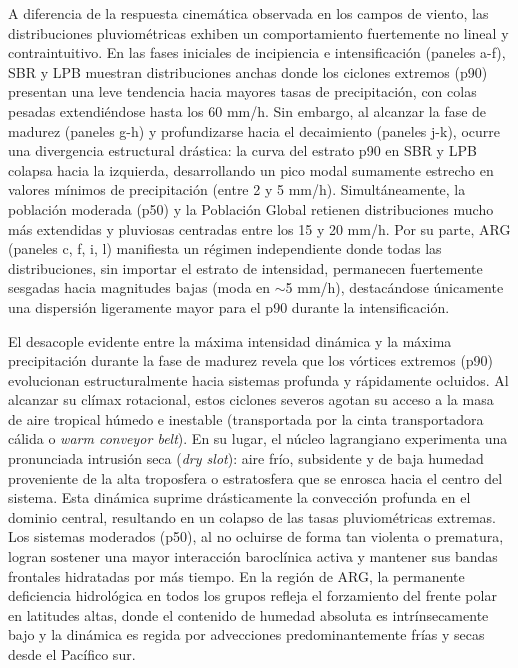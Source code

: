 A diferencia de la respuesta cinemática observada en los campos de viento, las distribuciones pluviométricas exhiben un comportamiento fuertemente no lineal y contraintuitivo. En las fases iniciales de incipiencia e intensificación (paneles a-f), SBR y LPB muestran distribuciones anchas donde los ciclones extremos (p90) presentan una leve tendencia hacia mayores tasas de precipitación, con colas pesadas extendiéndose hasta los 60 mm/h. Sin embargo, al alcanzar la fase de madurez (paneles g-h) y profundizarse hacia el decaimiento (paneles j-k), ocurre una divergencia estructural drástica: la curva del estrato p90 en SBR y LPB colapsa hacia la izquierda, desarrollando un pico modal sumamente estrecho en valores mínimos de precipitación (entre 2 y 5 mm/h). Simultáneamente, la población moderada (p50) y la Población Global retienen distribuciones mucho más extendidas y pluviosas centradas entre los 15 y 20 mm/h. Por su parte, ARG (paneles c, f, i, l) manifiesta un régimen independiente donde todas las distribuciones, sin importar el estrato de intensidad, permanecen fuertemente sesgadas hacia magnitudes bajas (moda en $\sim$5 mm/h), destacándose únicamente una dispersión ligeramente mayor para el p90 durante la intensificación.

El desacople evidente entre la máxima intensidad dinámica y la máxima precipitación durante la fase de madurez revela que los vórtices extremos (p90) evolucionan estructuralmente hacia sistemas profunda y rápidamente ocluidos. Al alcanzar su clímax rotacional, estos ciclones severos agotan su acceso a la masa de aire tropical húmedo e inestable (transportada por la cinta transportadora cálida o \textit{warm conveyor belt}). En su lugar, el núcleo lagrangiano experimenta una pronunciada intrusión seca (\textit{dry slot}): aire frío, subsidente y de baja humedad proveniente de la alta troposfera o estratosfera que se enrosca hacia el centro del sistema. Esta dinámica suprime drásticamente la convección profunda en el dominio central, resultando en un colapso de las tasas pluviométricas extremas. Los sistemas moderados (p50), al no ocluirse de forma tan violenta o prematura, logran sostener una mayor interacción baroclínica activa y mantener sus bandas frontales hidratadas por más tiempo. En la región de ARG, la permanente deficiencia hidrológica en todos los grupos refleja el forzamiento del frente polar en latitudes altas, donde el contenido de humedad absoluta es intrínsecamente bajo y la dinámica es regida por advecciones predominantemente frías y secas desde el Pacífico sur.

